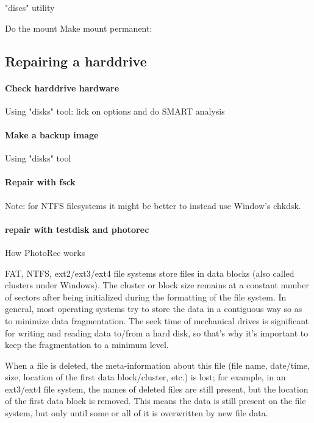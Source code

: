 "discs" utility



Do the mount 
Make mount permanent: 


\subsection{Repairing a harddrive}

\paragraph{Check harddrive hardware} Using "disks" tool: lick on options and do SMART analysis

\paragraph{Make a backup image} Using "disks" tool

\paragraph{Repair with fsck} Note: for NTFS filesystems it might be better to instead use Window's chkdsk.


\paragraph{repair with testdisk and photorec}
How PhotoRec works

FAT, NTFS, ext2/ext3/ext4 file systems store files in data blocks (also called clusters under Windows). The cluster or block size remains at a constant number of sectors after being initialized during the formatting of the file system. In general, most operating systems try to store the data in a contiguous way so as to minimize data fragmentation. The seek time of mechanical drives is significant for writing and reading data to/from a hard disk, so that's why it's important to keep the fragmentation to a minimum level.

When a file is deleted, the meta-information about this file (file name, date/time, size, location of the first data block/cluster, etc.) is lost; for example, in an ext3/ext4 file system, the names of deleted files are still present, but the location of the first data block is removed. This means the data is still present on the file system, but only until some or all of it is overwritten by new file data.

